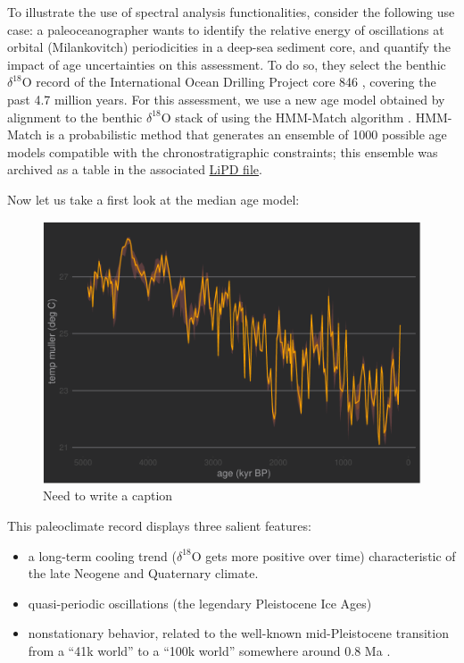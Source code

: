 \documentclass[gc, manuscript]{copernicus}
\begin{document}
To illustrate the use of spectral analysis functionalities, consider the
following use case: a paleoceanographer wants to identify the relative
energy of oscillations at orbital (Milankovitch) periodicities in a
deep-sea sediment core, and quantify the impact of age uncertainties on
this assessment. To do so, they select the benthic
\(\delta^{18}\mathrm{O}\) record of the International Ocean Drilling
Project core 846 \citep[\citet{Shackleton95}]{mix1995benthic}, covering
the past 4.7 million years. For this assessment, we use a new age model
obtained by alignment to the benthic \(\delta^{18}\mathrm{O}\) stack of
\citet{LisieckiRaymo05} using the HMM-Match algorithm
\citep[\citet{Khider_2017}]{ProbStack}. HMM-Match is a probabilistic
method that generates an ensemble of 1000 possible age models compatible
with the chronostratigraphic constraints; this ensemble was archived as
a table in the associated
\href{http://lipdverse.org/geoChronR-examples/ODP846.Lawrence.2006.lpd}{LiPD
file}.

Now let us take a first look at the median age model:

\begin{figure}
\centering
\includegraphics{geoChronR-paper_files/figure-latex/unnamed-chunk-16-1.pdf}
\caption{\label{fig:unnamed-chunk-16}Need to write a caption}
\end{figure}

This paleoclimate record displays three salient features:

\begin{itemize}
\item
  a long-term cooling trend (\(\delta^{18}\mathrm{O}\) gets more
  positive over time) characteristic of the late Neogene and Quaternary
  climate.
\item
  quasi-periodic oscillations (the legendary Pleistocene Ice Ages)
\item
  nonstationary behavior, related to the well-known mid-Pleistocene
  transition from a ``41k world'' to a ``100k world'' somewhere around
  0.8 Ma \citep{Paillard_2001}.
\end{itemize}
\end{document}

